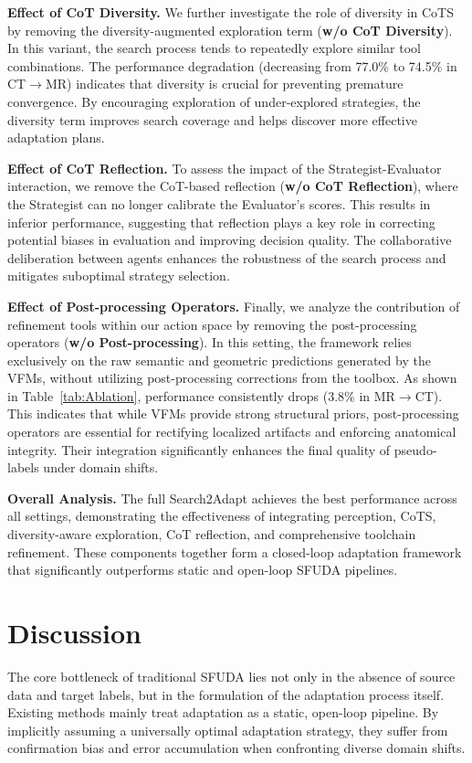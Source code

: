 \documentclass[sigconf, screen]{acmart}
\begin{document}
\textbf{Effect of CoT Diversity.}
We further investigate the role of diversity in CoTS by removing the diversity-augmented exploration term (\textbf{w/o CoT Diversity}). In this variant, the search process tends to repeatedly explore similar tool combinations. The performance degradation (decreasing from 77.0\% to 74.5\% in CT$\rightarrow$MR) indicates that diversity is crucial for preventing premature convergence. By encouraging exploration of under-explored strategies, the diversity term improves search coverage and helps discover more effective adaptation plans.

\textbf{Effect of CoT Reflection.}
To assess the impact of the Strategist-Evaluator interaction, we remove the CoT-based reflection (\textbf{w/o CoT Reflection}), where the Strategist can no longer calibrate the Evaluator's scores. This results in inferior performance, suggesting that reflection plays a key role in correcting potential biases in evaluation and improving decision quality. The collaborative deliberation between agents enhances the robustness of the search process and mitigates suboptimal strategy selection.

\textbf{Effect of Post-processing Operators.}
Finally, we analyze the contribution of refinement tools within our action space by removing the post-processing operators (\textbf{w/o Post-processing}). In this setting, the framework relies exclusively on the raw semantic and geometric predictions generated by the VFMs, without utilizing post-processing corrections from the toolbox. As shown in Table~\ref{tab:Ablation}, performance consistently drops (3.8\% in MR$\rightarrow$CT). This indicates that while VFMs provide strong structural priors, post-processing operators are essential for rectifying localized artifacts and enforcing anatomical integrity. Their integration significantly enhances the final quality of pseudo-labels under domain shifts.

\textbf{Overall Analysis.}
The full Search2Adapt achieves the best performance across all settings, demonstrating the effectiveness of integrating perception, CoTS, diversity-aware exploration, CoT reflection, and comprehensive toolchain refinement. These components together form a closed-loop adaptation framework that significantly outperforms static and open-loop SFUDA pipelines.
\section{Discussion}
The core bottleneck of traditional SFUDA lies not only in the absence of source data and target labels, but in the formulation of the adaptation process itself. Existing methods mainly treat adaptation as a static, open-loop pipeline. By implicitly assuming a universally optimal adaptation strategy, they suffer from confirmation bias and error accumulation when confronting diverse domain shifts.
\end{document}
